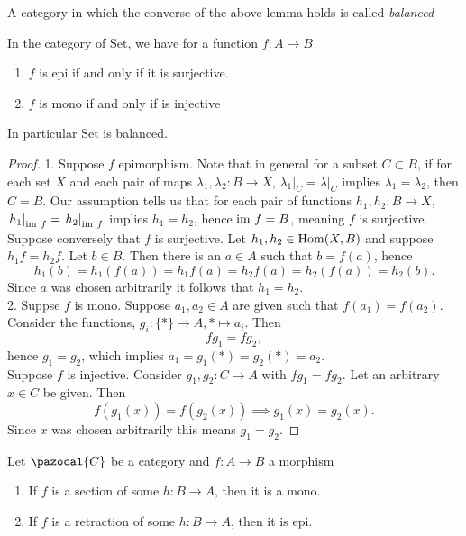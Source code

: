 \begin{definition}
    A category in which the converse of the above lemma holds is called \emph{balanced}
\end{definition}
\begin{lemma}
    In the category of $\mathrm{Set}$, we have for a function $f: A\rightarrow B$
    \begin{enumerate}
        \item $f$ is epi if and only if it is surjective.
        \item $f$ is mono if and only if is injective
    \end{enumerate}
    In particular $\mathrm{Set}$ is balanced. 
\end{lemma}
\begin{proof}
    1. Suppose $f$ epimorphism. Note that in general for a subset $C\subset B$, if for each set $X$ and each pair of maps $\lambda_1,\lambda_2: B\rightarrow X$,  $\left.\lambda_1\right|_{C}=\left.\lambda\right|_C$ implies $\lambda_1 = \lambda_2$, then $C=B$. Our assumption tells us that for each pair of functions $h_1,h_2: B\rightarrow X$, $\left.h_1\right|_{\mathrm{im}\ f} = \left.  h_2\right|_{\mathrm{im}\ f}$ implies $h_1 = h_2$, hence $\mathrm{im} \ f = B$, meaning $f$ is surjective.\\
    Suppose conversely that $f$ is surjective. Let $h_1,h_2\in \mathrm{Hom}(X,B)$ and suppose $h_1 f= h_2 f$. Let $b\in B$. Then there is an $a\in A$ such that $b=f(a)$, hence
    $$h_1(b) = h_1(f(a))=h_1f(a)= h_2f(a)=h_2(f(a))=h_2(b).$$
    Since $a$ was chosen arbitrarily it follows that $h_1=h_2$.\\ 
    2. Suppse $f$ is mono. Suppose $a_1,a_2\in A$ are given such that $f(a_1)=f(a_2)$. Consider the functions, $g_i : \{\ast\} \rightarrow A,\ast\mapsto a_i$. Then 
    $$ 
        fg_1 = fg_2,
    $$
    hence $g_1 = g_2$, which implies $a_1=g_1(\ast)=g_2(\ast)= a_2$.\\
    Suppose $f$ is injective. Consider $g_1,g_2 : C\rightarrow A$ with $fg_1 = fg_2$. Let an arbitrary $x\in C$ be given. Then 
    $$
        f(g_1(x)) = f(g_2(x)) \implies g_1(x) = g_2(x).
    $$ 
    Since $x$ was chosen arbitrarily this means $g_1 = g_2$.    
\end{proof}
\begin{lemma}
    Let $\pazocal{C}$ be a category and $f : A\rightarrow B$ a morphism
    \begin{enumerate}
        \item If $f$ is a section of some $h: B\rightarrow A$, then it is a mono.
        \item If $f$ is a retraction of some $h: B\rightarrow A$, then it is epi.
    \end{enumerate} 
\end{lemma}
